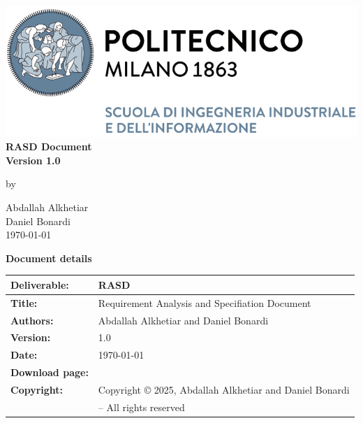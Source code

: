 \documentclass[11pt,twoside]{article}
\begin{document}
\begin{center}
\thispagestyle{empty}
\includegraphics[scale=1.25]{Images/PolimiLogo}\\
\vspace{4cm}
\textbf{\Huge{RASD Document}}\\
\vspace{1.5cm}
\textbf{\Large{Version 1.0}}\\
\bigskip \par
by \par
\large{Abdallah Alkhetiar}\\
\large{Daniel Bonardi}\\
\bigskip \bigskip
\large{\today}
\end{center}

\newpage

\setcounter{page}{1}
\begin{center}
\textbf{\Huge{Document details}}
\end{center}
\begin{table}[h!]
\begin{tabu} to \textwidth { |X[0.25,r,p] || X[0.75,l,p]| }
\hline

\textbf{Deliverable:} & RASD\\
\hline
\textbf{Title:} & Requirement Analysis and Specifiation Document \\
\hline
\textbf{Authors:} & Abdallah Alkhetiar and Daniel Bonardi \\
\hline
\textbf{Version:} & 1.0 \\ 
\hline
\textbf{Date:} & \today \\
\hline
\textbf{Download page:} & \href{https://github.com/Zero3474/AlkhetiarBonardi.git}{\texttt{\color{blue}{https://github.com/Zero3474/AlkhetiarBonardi.git}}} \\
\hline
\textbf{Copyright:} & Copyright © 2025, Abdallah Alkhetiar and Daniel Bonardi \\
& – All rights reserved \\
\hline
\end{tabu}
\end{table}
\end{document}
